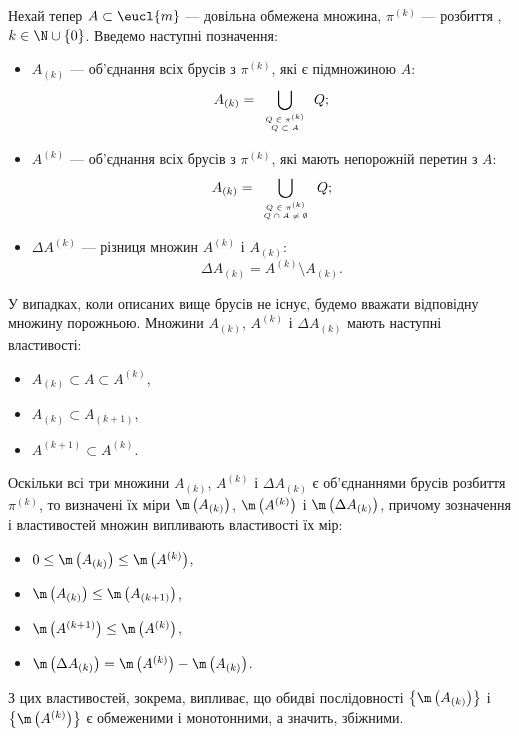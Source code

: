 Нехай тепер ${A\subset\eucl{m}}$ --- довільна обмежена множина, ${\pi^{(k)}}$ --- розбиття , $k\in\N\cup\{0\}$. Введемо наступні позначення:
\begin{itemize}\label{partition_sets}
\item $A_{(k)}$ --- об'єднання всіх брусів з ${\pi^{(k)}}$, які є підмножиною $A$:
\[
A_{(k)} = \bigcup\limits_{\tiny{\begin{array}{c}Q\in\pi^{(k)}\\Q\subset A\end{array}}}Q;
\]
\item $A^{(k)}$ --- об'єднання всіх брусів з ${\pi^{(k)}}$, які мають непорожній перетин з $A$:
\[
A_{(k)} = \bigcup\limits_{\tiny{\begin{array}{c}Q\in\pi^{(k)}\\Q\cap A\neq \emptyset\end{array}}}Q;
\]
\item $\Delta A^{(k)}$ --- різниця множин $A^{(k)}$ і $A_{(k)}$:
\[
\Delta A_{(k)} = A^{(k)} \setminus A_{(k)}.
\]
\end{itemize}
У випадках, коли описаних вище брусів не існує, будемо вважати відповідну множину порожньою.
Множини ${A_{(k)}}$, ${A^{(k)}}$ і ${\Delta A_{(k)}}$ мають наступні властивості:
\begin{itemize}
\item ${A_{(k)} \subset A \subset A^{(k)}}$,
\item ${A_{(k)} \subset A_{(k+1)}}$,
\item ${A^{(k+1)} \subset A^{(k)}}$.
\end{itemize}
Оскільки всі три множини ${A_{(k)}}$, ${A^{(k)}}$ і ${\Delta A_{(k)}}$ є об'єднаннями брусів розбиття ${\pi^{(k)}}$, то визначені їх міри ${\m\left(A_{(k)}\right)}$, ${\m\left(A^{(k)}\right)}$ і ${\m\left(\Delta A_{(k)}\right)}$, причому зозначення і властивостей множин випливають властивості їх мір:
\begin{itemize}
\item ${0 \leq \m\left(A_{(k)}\right) \leq \m\left(A^{(k)}\right)}$,
\item ${\m\left(A_{(k)}\right) \leq \m\left(A_{(k+1)}\right)}$,
\item ${\m\left(A^{(k+1)}\right) \leq \m\left(A^{(k)}\right)}$,
\item ${\m\left(\Delta A_{(k)}\right) = \m\left(A^{(k)}\right) - \m\left(A_{(k)}\right)}$.
\end{itemize}
З цих властивостей, зокрема, випливає, що обидві послідовності ${\left\{\m\left(A_{(k)}\right)\right\}}$ і ${\left\{\m\left(A^{(k)}\right)\right\}}$ є обмеженими і монотонними, а значить, збіжними.
